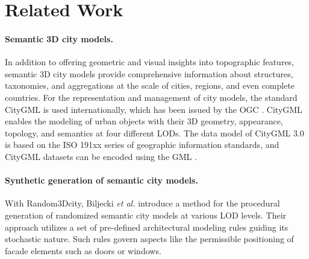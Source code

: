 \section{Related Work}
\paragraph{Semantic 3D city models.}
In addition to offering geometric and visual insights into topographic features, semantic 3D city models provide comprehensive information about structures, taxonomies, and aggregations at the scale of cities, regions, and even complete countries. %
For the representation and management of city models, the standard CityGML is used internationally, which has been issued by the \gls{OGC} \cite{Kolbe2009,Groeger2012,kolbeOGCCityGeography2021}.
CityGML enables the modeling of urban objects
with their 3D geometry, appearance, topology, and semantics at four different \glspl{LOD}.
The data model of CityGML 3.0 is based on the ISO 191xx series of geographic information standards, and CityGML datasets can be encoded using the \gls{GML} \cite{Kutzner2020}.

\paragraph{Synthetic generation of semantic city models.}
With Random3Dcity, Biljecki \textit{et al.} \cite{BiljeckiRandom3Dcity} introduce a method for the procedural generation of randomized semantic city models at various \gls{LOD} levels.
Their approach utilizes a set of pre-defined architectural modeling rules guiding its stochastic nature.
Such rules govern aspects like the permissible positioning of facade elements such as doors or windows.

